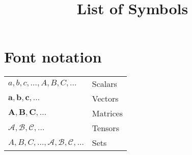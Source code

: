 \documentclass{article}
\begin{document}
\title{List of Symbols}
\maketitle

\section{Font notation}
\begin{xltabular}{\textwidth}{XX}
  $a,b,c, \dots, A, B, C, \dots$ & Scalars \\
  $\mathbf{a}, \mathbf{b}, \mathbf{c}, \dots$ & Vectors \\
  $\mathbf{A}, \mathbf{B}, \mathbf{C}, \dots$ & Matrices \\
  $\bm{\mathcal{A}}, \bm{\mathcal{B}}, \bm{\mathcal{C}}, \dots$ & Tensors \\
  $A, B, C, \dots, \mathcal{A}, \mathcal{B}, \mathcal{C}, \dots$ &  Sets\\
\end{xltabular}
\end{document}
